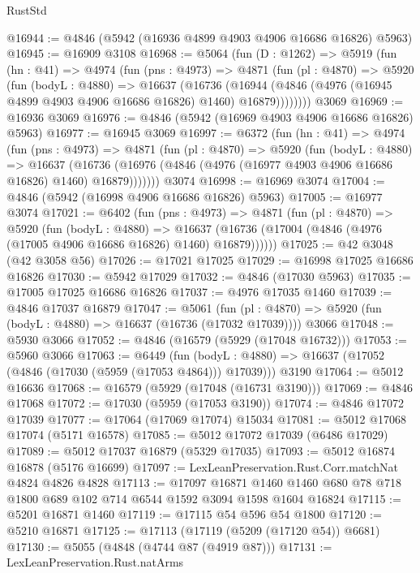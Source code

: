 \begin{lexlean}{RustStd}
\begin{coremodule}
@16944 := @4846 (@5942 (@16936 @4899 @4903 @4906 @16686 @16826) @5963)
@16945 := @16909 @3108
@16968 := @5064
    (fun (D : @1262) =>
    @5919
      (fun (hn : @41) =>
      @4974
        (fun (pns : @4973) =>
        @4871
          (fun (pl : @4870) =>
          @5920
            (fun (bodyL : @4880) =>
            @16637
              (@16736
                (@16944 (@4846 (@4976 (@16945 @4899 @4903 @4906 @16686 @16826) @1460) @16879))))))))
    @3069
@16969 := @16936 @3069
@16976 := @4846 (@5942 (@16969 @4903 @4906 @16686 @16826) @5963)
@16977 := @16945 @3069
@16997 := @6372
    (fun (hn : @41) =>
    @4974
      (fun (pns : @4973) =>
      @4871
        (fun (pl : @4870) =>
        @5920
          (fun (bodyL : @4880) =>
          @16637
            (@16736 (@16976 (@4846 (@4976 (@16977 @4903 @4906 @16686 @16826) @1460) @16879)))))))
    @3074
@16998 := @16969 @3074
@17004 := @4846 (@5942 (@16998 @4906 @16686 @16826) @5963)
@17005 := @16977 @3074
@17021 := @6402
    (fun (pns : @4973) =>
    @4871
      (fun (pl : @4870) =>
      @5920
        (fun (bodyL : @4880) =>
        @16637 (@16736 (@17004 (@4846 (@4976 (@17005 @4906 @16686 @16826) @1460) @16879))))))
@17025 := @42 @3048 (@42 @3058 @56)
@17026 := @17021 @17025
@17029 := @16998 @17025 @16686 @16826
@17030 := @5942 @17029
@17032 := @4846 (@17030 @5963)
@17035 := @17005 @17025 @16686 @16826
@17037 := @4976 @17035 @1460
@17039 := @4846 @17037 @16879
@17047 := @5061
    (fun (pl : @4870) => @5920 (fun (bodyL : @4880) => @16637 (@16736 (@17032 @17039))))
    @3066
@17048 := @5930 @3066
@17052 := @4846 (@16579 (@5929 (@17048 @16732)))
@17053 := @5960 @3066
@17063 := @6449
    (fun (bodyL : @4880) => @16637 (@17052 (@4846 (@17030 (@5959 (@17053 @4864))) @17039)))
    @3190
@17064 := @5012 @16636
@17068 := @16579 (@5929 (@17048 (@16731 @3190)))
@17069 := @4846 @17068
@17072 := @17030 (@5959 (@17053 @3190))
@17074 := @4846 @17072 @17039
@17077 := @17064 (@17069 @17074) @15034
@17081 := @5012 @17068 @17074 (@5171 @16578)
@17085 := @5012 @17072 @17039 (@6486 @17029)
@17089 := @5012 @17037 @16879 (@5329 @17035)
@17093 := @5012 @16874 @16878 (@5176 @16699)
@17097 := LexLeanPreservation.Rust.Corr.matchNat @4824 @4826 @4828
@17113 := @17097
    @16871
    @1460
    @1460
    @680
    @78
    @718
    @1800
    @689
    @102
    @714
    @6544
    @1592
    @3094
    @1598
    @1604
    @16824
@17115 := @5201 @16871 @1460
@17119 := @17115 @54 @596 @54 @1800
@17120 := @5210 @16871
@17125 := @17113 (@17119 (@5209 (@17120 @54)) @6681)
@17130 := @5055 (@4848 (@4744 @87 (@4919 @87)))
@17131 := LexLeanPreservation.Rust.natArms

\end{coremodule}
\end{lexlean}
